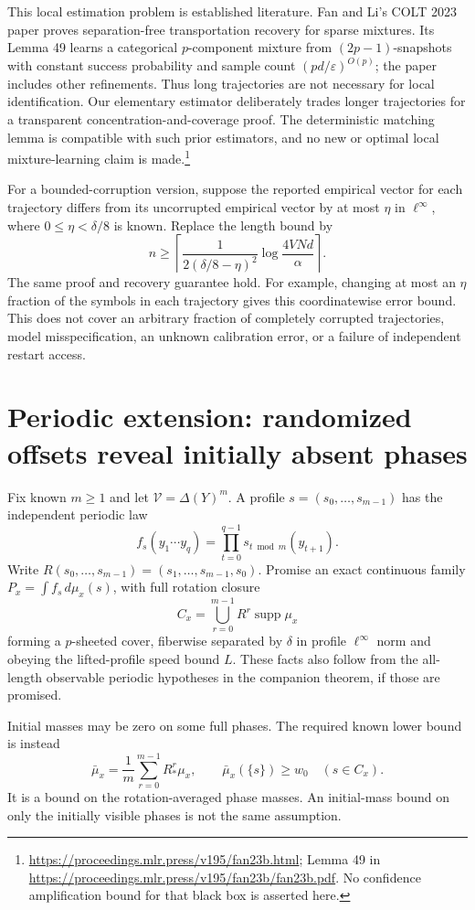 \documentclass[11pt]{article}
\theoremstyle{remark}\newtheorem{remark}[theorem]{Remark}
\newcommand{\supp}{\operatorname{supp}}
\begin{document}
This local estimation problem is established literature. Fan and Li's COLT 2023 paper proves separation-free transportation recovery for sparse mixtures. Its Lemma 49 learns a categorical $p$-component mixture from $(2p-1)$-snapshots with constant success probability and sample count $(pd/\varepsilon)^{O(p)}$; the paper includes other refinements. Thus long trajectories are not necessary for local identification. Our elementary estimator deliberately trades longer trajectories for a transparent concentration-and-coverage proof. The deterministic matching lemma is compatible with such prior estimators, and no new or optimal local mixture-learning claim is made.\footnote{\url{https://proceedings.mlr.press/v195/fan23b.html}; Lemma 49 in \url{https://proceedings.mlr.press/v195/fan23b/fan23b.pdf}. No confidence amplification bound for that black box is asserted here.}

For a bounded-corruption version, suppose the reported empirical vector for each trajectory differs from its uncorrupted empirical vector by at most $\eta$ in $\ell^\infty$, where $0\leq\eta<\delta/8$ is known. Replace the length bound by
\[
 n\geq\left\lceil\frac1{2(\delta/8-\eta)^2}\log\frac{4VNd}{\alpha}\right\rceil.
\]
The same proof and recovery guarantee hold. For example, changing at most an $\eta$ fraction of the symbols in each trajectory gives this coordinatewise error bound. This does not cover an arbitrary fraction of completely corrupted trajectories, model misspecification, an unknown calibration error, or a failure of independent restart access.

\section{Periodic extension: randomized offsets reveal initially absent phases}
Fix known $m\geq1$ and let $\mathcal V=\Delta(Y)^m$. A profile $s=(s_0,\ldots,s_{m-1})$ has the independent periodic law
\[
 f_s(y_1\cdots y_q)=\prod_{t=0}^{q-1}s_{t\bmod m}(y_{t+1}).
\]
Write $R(s_0,\ldots,s_{m-1})=(s_1,\ldots,s_{m-1},s_0)$.
Promise an exact continuous family $P_x=\int f_s\,d\mu_x(s)$, with full rotation closure
\[
 C_x=\bigcup_{r=0}^{m-1}R^r\supp\mu_x
\]
forming a $p$-sheeted cover, fiberwise separated by $\delta$ in profile $\ell^\infty$ norm and obeying the lifted-profile speed bound $L$. These facts also follow from the all-length observable periodic hypotheses in the companion theorem, if those are promised.

Initial masses may be zero on some full phases. The required known lower bound is instead
\[
 \bar\mu_x=\frac1m\sum_{r=0}^{m-1}R_*^r\mu_x,
 \qquad \bar\mu_x(\{s\})\geq w_0\quad(s\in C_x).
\]
It is a bound on the rotation-averaged phase masses. An initial-mass bound on only the initially visible phases is not the same assumption.
\end{document}
